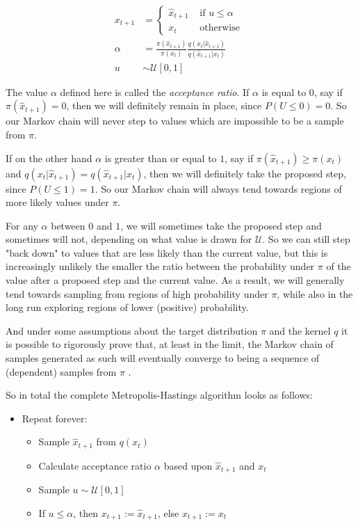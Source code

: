 \begin{align*}
x_{t+1} & = \begin{cases}
    \hat{x}_{t+1} & \text{ if } u \le \alpha \\
            x_{t} & \text{ otherwise }
            \end{cases} \\
\alpha & = \frac{\pi(\hat{x}_{t+1})}{\pi(x_t)} \frac{q(x_t | \hat{x}_{t+1})}{q(\hat{x}_{t+1} | x_t)} \\
u & \sim \mathcal{U}[0,1]
\end{align*}

The value $\alpha$ defined here is called the \textit{acceptance ratio}. If $\alpha$ is equal to $0$, say if $\pi(\hat{x}_{t+1}) = 0$, then we will definitely remain in place, since $P(U \le 0) = 0$. So our Markov chain will never step to values which are impossible to be a sample from $\pi$.

If on the other hand $\alpha$ is greater than or equal to $1$, say if $\pi(\hat{x}_{t+1}) \ge {\pi(x_t)}$ and $q(x_t | \hat{x}_{t+1}) = q(\hat{x}_{t+1} | x_t)$, then we will definitely take the proposed step, since $P(U \le 1) = 1$. So our Markov chain will always tend towards regions of more likely values under $\pi$.

For any $\alpha$ between $0$ and $1$, we will sometimes take the proposed step and sometimes will not, depending on what value is drawn for $\mathcal{U}$. So we can still step "back down" to values that are less likely than the current value, but this is increasingly unlikely the smaller the ratio between the probability under $\pi$ of the value after a proposed step and the current value. As a result, we will generally tend towards sampling from regions of high probability under $\pi$, while also in the long run exploring regions of lower (positive) probability.

And under some assumptions about the target distribution $\pi$ and the kernel $q$ it is possible to rigorously prove that, at least in the limit, the Markov chain of samples generated as such will eventually converge to being a sequence of (dependent) samples from $\pi$ \cite{metropolis1953equation}.

So in total the complete Metropolis-Hastings algorithm looks as follows:

\begin{minipage}{\linewidth}
\begin{itemize}
\item Repeat forever:
  \begin{itemize}
  \item Sample $\hat{x}_{t+1}$ from $q(x_t)$
  \item Calculate acceptance ratio $\alpha$ based upon $\hat{x}_{t+1}$ and $x_t$
  \item Sample $u \sim \mathcal{U}[0,1]$
  \item If $u \le \alpha$, then $x_{t+1} := \hat{x}_{t+1}$, else $x_{t+1} := x_t$
  \end{itemize}
\end{itemize}
\end{minipage}

